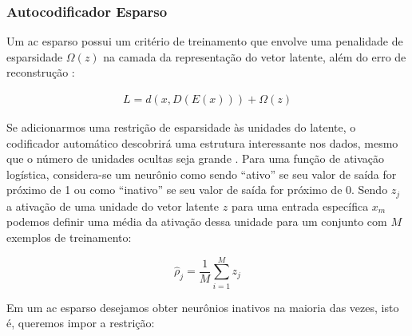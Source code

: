 





\subsubsection{Autocodificador Esparso} \label{sec:ac_es}

Um \acrshort{ac} esparso possui um critério de treinamento que envolve uma penalidade de esparsidade $\Omega(z)$ na camada da representação do vetor latente, além do erro de reconstrução \cite{Goodfellow2016}:

\begin{equation}
\label{eq:loss_sparse}
\begin{aligned}
L = d(x,D(E(x))) + \Omega(z) 
\end{aligned}
\end{equation}

Se adicionarmos uma restrição de esparsidade às unidades do latente, o codificador automático descobrirá uma estrutura interessante nos dados, mesmo que o número de unidades ocultas seja grande \cite{ng2011sparse}. 
Para uma função de ativação logística, considera-se um neurônio como sendo ``ativo'' se seu valor de saída for próximo de 1 ou como ``inativo'' se seu valor de saída for próximo de 0. Sendo $z_j$ a ativação de uma unidade do vetor latente ${z}$ para uma entrada específica $x_m$ podemos definir uma média da ativação dessa unidade para um conjunto com $M$ exemplos de treinamento:

\begin{equation}
\hat{\rho}_{j} = \frac{1}{M}\sum_{i=1}^M z_j
\end{equation}

Em um \acrshort{ac} esparso desejamos obter neurônios inativos na maioria das vezes, isto é, queremos impor a restrição:

